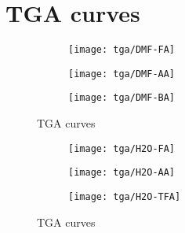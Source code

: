 
\section{TGA curves}\label{appx:def:tga}

\begin{figure}[htbp]
    \centering

    \begin{subfigure}{0.45\linewidth}
        \texttt{[image: tga/DMF-FA]}%
        \label{appx:def:fgr:tga-dmf-fa}
    \end{subfigure}
    \begin{subfigure}{0.45\linewidth}
        \texttt{[image: tga/DMF-AA]}%
        \label{appx:def:fgr:tga-dmf-aa}
    \end{subfigure}

    
    \begin{subfigure}{0.45\linewidth}
        \texttt{[image: tga/DMF-BA]}%
        \label{appx:def:fgr:tga-dmf-ba}
    \end{subfigure}

    \caption{TGA curves}%
    \label{appx:def:fgr:tga-dataset}
\end{figure}
\begin{figure}[htb]\ContinuedFloat{}
    \centering

    \begin{subfigure}{0.45\linewidth}
        \texttt{[image: tga/H2O-FA]}%
        \label{appx:def:fgr:tga-h2o-fa}
    \end{subfigure}
    \begin{subfigure}{0.45\linewidth}
        \texttt{[image: tga/H2O-AA]}%
        \label{appx:def:fgr:tga-h2o-aa}
    \end{subfigure}

    \begin{subfigure}{0.45\linewidth}
        \texttt{[image: tga/H2O-TFA]}%
        \label{appx:def:fgr:tga-h2o-tfa}
    \end{subfigure}

    \caption{TGA curves}%
\end{figure}
